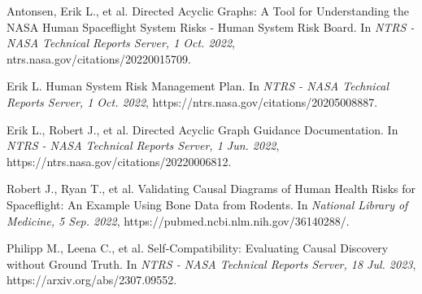 \documentclass{article}
\begin{document}


  


\begin{thebibliography}{1}


\bibitem{}
Antonsen, Erik L., et al.
\newblock Directed Acyclic Graphs: A Tool for Understanding the NASA Human Spaceflight System Risks - Human System Risk Board.
\newblock In {\em NTRS - NASA Technical Reports Server, 1 Oct. 2022}, ntrs.nasa.gov/citations/20220015709.

\bibitem{}
Erik L.
\newblock Human System Risk Management Plan.
\newblock In {\em NTRS - NASA Technical Reports Server, 1 Oct. 2022}, https://ntrs.nasa.gov/citations/20205008887.

\bibitem{}
Erik L., Robert J., et al.
\newblock Directed Acyclic Graph Guidance Documentation.
\newblock In {\em NTRS - NASA Technical Reports Server, 1 Jun. 2022}, https://ntrs.nasa.gov/citations/20220006812.

\bibitem{}
Robert J., Ryan T., et al.
\newblock Validating Causal Diagrams of Human Health Risks for Spaceflight: An Example Using Bone Data from Rodents.
\newblock In {\em National Library of Medicine, 5 Sep. 2022}, https://pubmed.ncbi.nlm.nih.gov/36140288/.

\bibitem{}
Philipp M., Leena C., et al.
\newblock Self-Compatibility: Evaluating Causal Discovery without Ground Truth.
\newblock In {\em NTRS - NASA Technical Reports Server, 18 Jul. 2023}, https://arxiv.org/abs/2307.09552.


\end{thebibliography}
\end{document}
